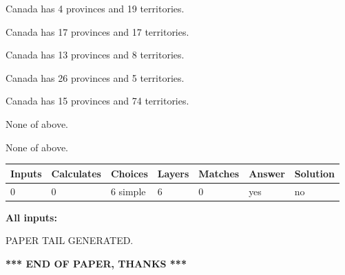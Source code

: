 \documentclass[12pt]{article}
\begin{document}
 
Canada has   4 provinces and  19 territories.
 
 
Canada has  17 provinces and  17 territories.
 
 
Canada has  13 provinces and  8 territories.
 
 
Canada has  26 provinces and  5 territories.
 
 
Canada has  15 provinces and  74 territories.
 
 
 None of above.
 
 
\noindent{}
 
 
 None of above.
 
 
\noindent{}
 
 
   
   
   
   
\noindent\begin{tabular}{|l|l|l|l|l|l|l|}
 \hline
Inputs & Calculates & Choices & Layers & Matches & Answer & Solution \\ \hline
 0  & 
 0  & 
 6
  simple  
  & 
 6  & 
 0  & 
  yes & 
  no 
  \\ \hline
 \end{tabular}
   
   
   
   
\noindent{}
   
   
   
   
\noindent\vspace{0.1in}\hspace{-0.08in} {\textbf{\Large{All inputs: }}}
   
   
   
   
   
   
 \vspace{0.2in}
 
   
   
\vspace{2.0in} PAPER TAIL GENERATED.
   
   
   
   
\vspace{1.0in} 
{\textbf{\large{ *** END OF PAPER, THANKS *** }}} 
   
\end{document}
